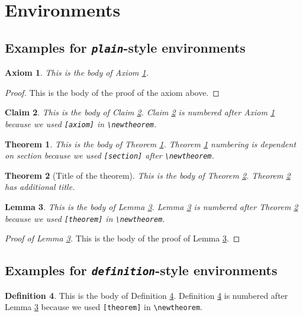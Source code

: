 \documentclass[aap]{imsart}
\theoremstyle{plain}
\newtheorem{axiom}{Axiom}
\newtheorem{claim}[axiom]{Claim}
\newtheorem{theorem}{Theorem}[section]
\newtheorem{lemma}[theorem]{Lemma}
\theoremstyle{definition}
\newtheorem{definition}[theorem]{Definition}
\begin{document}
\section{Environments}

\subsection{Examples for \emph{\texttt{plain}}-style environments}
\begin{axiom}\label{ax1}
This is the body of Axiom \ref{ax1}.
\end{axiom}

\begin{proof}
This is the body of the proof of the axiom above.
\end{proof}

\begin{claim}\label{cl1}
This is the body of Claim \ref{cl1}. Claim \ref{cl1} is numbered after
Axiom \ref{ax1} because we used \verb|[axiom]| in \verb|\newtheorem|.
\end{claim}

\begin{theorem}\label{th1}
This is the body of Theorem \ref{th1}. Theorem \ref{th1} numbering is
dependent on section because we used \verb|[section]| after \verb|\newtheorem|.
\end{theorem}

\begin{theorem}[Title of the theorem]\label{th2}
This is the body of Theorem \ref{th2}. Theorem \ref{th2} has additional title.
\end{theorem}

\begin{lemma}\label{le1}
This is the body of Lemma \ref{le1}. Lemma \ref{le1} is numbered after
Theorem \ref{th2} because we used \verb|[theorem]| in \verb|\newtheorem|.
\end{lemma}


\begin{proof}[Proof of Lemma \ref{le1}]
This is the body of the proof of Lemma \ref{le1}.
\end{proof}

\subsection{Examples for \emph{\texttt{definition}}-style environments}
\begin{definition}\label{de1}
This is the body of Definition \ref{de1}. Definition \ref{de1} is numbered after
Lemma \ref{le1} because we used \verb|[theorem]| in \verb|\newtheorem|.
\end{definition}
\end{document}
